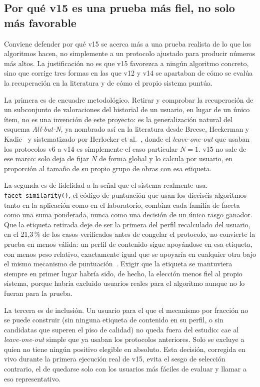 \subsection{Por qué v15 es una prueba más fiel, no solo más favorable}\label{sec:exp-v15-fidelidad}

Conviene defender por qué v15 se acerca más a una prueba realista de lo que los algoritmos
hacen, no simplemente a un protocolo ajustado para producir números más altos. La
justificación no es que v15 favorezca a ningún algoritmo concreto, sino que corrige tres
formas en las que v12 y v14 se apartaban de cómo se evalúa la recuperación en la literatura y
de cómo el propio sistema puntúa.

La primera es de encuadre metodológico. Retirar y comprobar la recuperación de un subconjunto
de valoraciones del historial de un usuario, en lugar de un único ítem, no es una invención de
este proyecto: es la generalización natural del esquema \emph{All-but-N}, ya nombrado así en
la literatura desde Breese, Heckerman y Kadie~\cite{breese1998empirical} y sistematizado por
Herlocker et al.~\cite{herlocker2004evaluating}, donde el \emph{leave-one-out} que usaban los
protocolos v6 a v14 es simplemente el caso particular \(N=1\). v15 no sale de ese marco: solo
deja de fijar \(N\) de forma global y lo calcula por usuario, en proporción al tamaño de su
propio grupo de obras con esa etiqueta.

La segunda es de fidelidad a la señal que el sistema realmente usa. \texttt{facet\_similarity()},
el código de puntuación que usan los dieciséis algoritmos tanto en la aplicación como en el
laboratorio, combina cada familia de faceta como una suma ponderada, nunca como una decisión
de un único rasgo ganador. Que la etiqueta retirada deje de ser la primera del perfil recalculado
del usuario, en el 21{,}3\,\% de los casos verificados antes de congelar el protocolo, no
convierte la prueba en menos válida: un perfil de contenido sigue apoyándose en esa etiqueta,
con menos peso relativo, exactamente igual que se apoyaría en cualquier otra bajo el mismo
mecanismo de puntuación~\cite{pazzani2007content}. Exigir que la etiqueta se mantuviera siempre
en primer lugar habría sido, de hecho, la elección menos fiel al propio sistema, porque
habría excluido usuarios reales para el algoritmo aunque no lo fueran para la prueba.

La tercera es de inclusión. Un usuario para el que el mecanismo por fracción no se puede
construir (sin ninguna etiqueta de contenido en su perfil, o sin candidatas que superen el piso
de calidad) no queda fuera del estudio: cae al \emph{leave-one-out} simple que ya usaban los
protocolos anteriores. Solo se excluye a quien no tiene ningún positivo elegible en absoluto.
Esta decisión, corregida en vivo durante la primera ejecución real de v15, evita el sesgo de
selección contrario, el de quedarse solo con los usuarios más fáciles de evaluar y llamar a
eso representativo.

